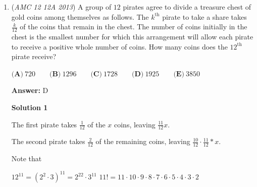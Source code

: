 \begin{enumerate}
 



\textbf{Solution 6}

Denote the number of rocks in each of the three piles as $a$, $b$, and $c$, respectively, and denote the weight of each rock in pile $C$ as $x$. We are given:\begin{align}\frac{40a + 50b}{a+b} &= 43\\\frac{40a + xc}{b+c} &= 44\\\end{align}From these equations, we get $b = \frac{3}{7}a$ and $c = \frac{4}{x-44}a$.

 Now, we can compute the average weight in combined piles B and C:\begin{align}\frac{50b + xc}{b+c} &= \frac{\frac{150}{7}a + \frac{4x}{x-44}a}{\frac{3}{7}a + \frac{4}{x-44}a}\\&= \frac{178x-6600}{3x-104}\\&= 59 + \frac{1}{3} - \frac{C}{3x-104}\\\end{align}Where $C$ is just some constant that I'm too lazy to compute. As $x$ approaches infinity, we have that $\frac{C}{3x-104}$ becomes negligibly small, and at some point, $59$ is attained. ~akliu

 


	\item (\textit{AMC 12 12A 2013}) A group of $12$ pirates agree to divide a treasure chest of gold coins among themselves as follows. The $k^\text{th}$ pirate to take a share takes $\frac{k}{12}$ of the coins that remain in the chest. The number of coins initially in the chest is the smallest number for which this arrangement will allow each pirate to receive a positive whole number of coins. How many coins does the $12^{\text{th}}$ pirate receive?


 $\textbf{(A)} \ 720 \qquad  \textbf{(B)} \ 1296 \qquad  \textbf{(C)} \ 1728 \qquad  \textbf{(D)} \ 1925 \qquad  \textbf{(E)} \ 3850$

 \textbf{Answer: }D



\textbf{Solution 1}

The first pirate takes $\frac{1}{12}$ of the $x$ coins, leaving $\frac{11}{12} x$.

 The second pirate takes $\frac{2}{12}$ of the remaining coins, leaving $\frac{10}{12}\cdot   \frac{11}{12}*x$.

 Note that

 $12^{11} = (2^2 \cdot 3)^{11} = 2^{22} \cdot 3^{11}$
$11! = 11 \cdot 10 \cdot 9 \cdot 8 \cdot 7 \cdot 6 \cdot 5 \cdot 4 \cdot 3 \cdot 2$


\end{enumerate}
